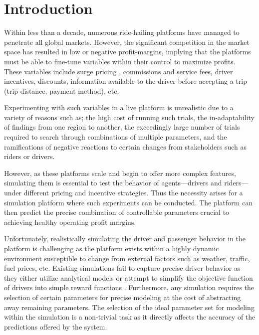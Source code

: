 \documentclass[runningheads]{llncs}
\begin{document}
\section{Introduction}

Within less than a decade, numerous ride-hailing platforms have managed to penetrate all global markets. However, the significant competition in the market space has resulted in low or negative profit-margins, implying that the platforms must be able to fine-tune variables within their control to maximize profits. These variables include surge pricing \cite{journals/corr/abs-1905-07544}, commissions and service fees, driver incentives, discounts, information available to the driver before accepting a trip (trip distance, payment method), etc.

Experimenting with such variables in a live platform is unrealistic due to a variety of reasons such as; the high cost of running such trials, the in-adaptability of findings from one region to another, the exceedingly large number of trials required to search through combinations of multiple parameters, and the ramifications of negative reactions to certain changes from stakeholders such as riders or drivers.

However, as these platforms scale and begin to offer more complex features, simulating them is essential to test the behavior of agents---drivers and riders--- under different pricing and incentive strategies. Thus the necessity arises for a simulation platform where such experiments can be conducted. The platform can then predict the precise combination of controllable parameters crucial to achieving healthy operating profit margins.

Unfortunately, realistically simulating the driver and passenger behavior in the platform is challenging as the platform exists within a highly dynamic environment susceptible to change from external factors such as weather, traffic, fuel prices, etc. Existing simulations fail to capture precise driver behavior as they either utilize analytical models \cite{bailey1987} or attempt to simplify the objective function of drivers into simple reward functions \cite{gao2018optimize, lin2018}. Furthermore, any simulation requires the selection of certain parameters for precise modeling at the cost of abstracting away remaining parameters. The selection of the ideal parameter set for modeling within the simulation is a non-trivial task as it directly affects the accuracy of the predictions offered by the system.
\end{document}
